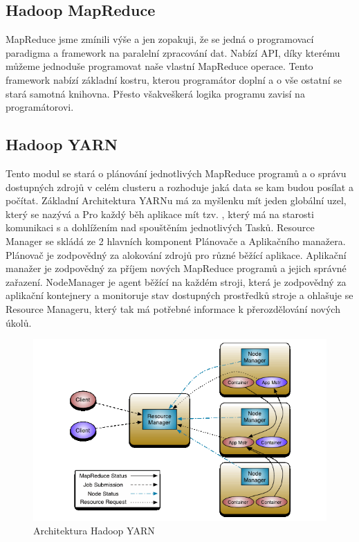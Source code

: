 \subsection{Hadoop MapReduce}
MapReduce jsme zmínili výše a jen zopakuji, že se jedná o programovací paradigma a framework na paralelní zpracování dat. Nabízí API, díky kterému můžeme jednoduše programovat naše vlastní MapReduce operace. Tento framework nabízí základní kostru, kterou programátor doplní a o vše ostatní se stará samotná knihovna. Přesto všakveškerá logika programu zavisí na programátorovi. 

\subsection{Hadoop YARN}
Tento modul se stará o plánování jednotlivých MapReduce programů a o správu dostupných zdrojů v celém clusteru a rozhoduje jaká data se kam budou posílat a počítat. Základní Architektura YARNu má za myšlenku mít jeden globální uzel, který se nazývá  a Pro každý běh aplikace mít tzv. , který má na starosti komunikaci s  a dohlížením nad spouštěním jednotlivých Tasků. Resource Manager se skládá ze 2 hlavních komponent Plánovače a Aplikačního manažera. Plánovač je zodpovědný za alokování zdrojů pro různé běžící aplikace. Aplikační manažer je zodpovědný za příjem nových MapReduce programů a jejich správné zařazení. NodeManager je agent běžící na každém stroji, která je zodpovědný za aplikační kontejnery a monitoruje stav dostupných prostředků stroje a ohlašuje se Resource Manageru, který tak má potřebné informace k přerozdělování nových úkolů.

\begin{figure}[h]
\centering
\includegraphics[scale=0.7]{images/yarn_architecture}
\caption{Architektura Hadoop YARN}
\label{fig:yarn}

\end{figure}



